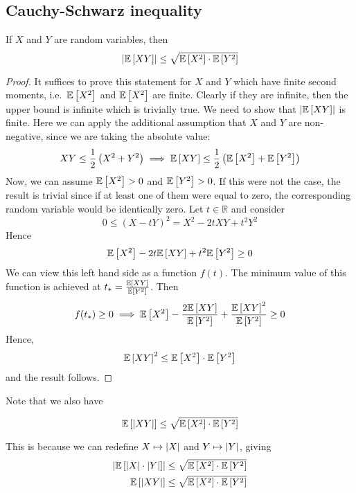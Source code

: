\subsection{Cauchy-Schwarz inequality}
\begin{theorem}
	If \(X\) and \(Y\) are random variables, then
	\[
		\abs{\mathbb{E}\left[{XY}\right]} \leq \sqrt{\mathbb{E}\left[{X^2}\right]\cdot\mathbb{E}\left[{Y^2}\right]}
	\]
\end{theorem}
\begin{proof}
	It suffices to prove this statement for \(X\) and \(Y\) which have finite second moments, i.e.\ \(\mathbb{E}\left[{X^2}\right]\) and \(\mathbb{E}\left[{X^2}\right]\) are finite.
	Clearly if they are infinite, then the upper bound is infinite which is trivially true.
	We need to show that \(\abs{\mathbb{E}\left[{XY}\right]}\) is finite.
	Here we can apply the additional assumption that \(X\) and \(Y\) are non-negative, since we are taking the absolute value:
	\[
		XY \leq \frac{1}{2}\left(X^2 + Y^2\right) \implies \mathbb{E}\left[{XY}\right] \leq \frac{1}{2}\left( \mathbb{E}\left[{X^2}\right] + \mathbb{E}\left[{Y^2}\right]  \right)
	\]
	Now, we can assume \(\mathbb{E}\left[{X^2}\right] > 0\) and \(\mathbb{E}\left[{Y^2}\right] > 0\).
	If this were not the case, the result is trivial since if at least one of them were equal to zero, the corresponding random variable would be identically zero.
	Let \(t \in \mathbb R\) and consider
	\[
		0 \leq (X - tY)^2 = X^2 - 2tXY + t^2Y^2
	\]
	Hence
	\[
		\mathbb{E}\left[{X^2}\right] - 2t\mathbb{E}\left[{XY}\right] + t^2\mathbb{E}\left[{Y^2}\right] \geq 0
	\]
	We can view this left hand side as a function \(f(t)\).
	The minimum value of this function is achieved at \(t_\ast = \frac{\mathbb{E}\left[{XY}\right]}{\mathbb{E}\left[{Y^2}\right]}\).
	Then
	\[
		f(t_\ast) \geq 0 \implies \mathbb{E}\left[{X^2}\right] - \frac{2\mathbb{E}\left[{XY}\right]}{\mathbb{E}\left[{Y^2}\right]} + \frac{\mathbb{E}\left[{XY}\right]^2}{\mathbb{E}\left[{Y^2}\right]} \geq 0
	\]
	Hence,
	\[
		\mathbb{E}\left[{XY}\right]^2 \leq \mathbb{E}\left[{X^2}\right]\cdot \mathbb{E}\left[{Y^2}\right]
	\]
	and the result follows.
\end{proof}

Note that we also have

\[
	\mathbb{E}\left[{\abs{XY}}\right] \leq \sqrt{\mathbb{E}\left[{X^2}\right]\cdot\mathbb{E}\left[{Y^2}\right]}
\]

This is because we can redefine \(X \mapsto \abs{X}\) and \(Y \mapsto \abs{Y}\), giving
\begin{align*}
	\abs{\mathbb{E}\left[{\abs{X} \cdot \abs{Y}}\right]} & \leq \sqrt{\mathbb{E}\left[{X^2}\right]\cdot\mathbb{E}\left[{Y^2}\right]} \\
	\mathbb{E}\left[{\abs{XY}}\right]                    & \leq \sqrt{\mathbb{E}\left[{X^2}\right]\cdot\mathbb{E}\left[{Y^2}\right]}
\end{align*}

